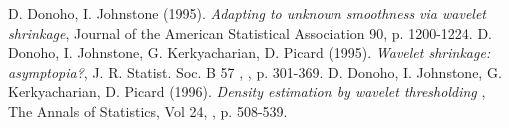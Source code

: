 %
\begin{thebibliography}{20}
 D. Donoho, I. Johnstone (1995). \textit{Adapting to unknown smoothness via wavelet shrinkage}, Journal of the American Statistical Association 90, p. 1200-1224.
 D. Donoho, I. Johnstone, G. Kerkyacharian, D. Picard (1995). \textit{Wavelet shrinkage: asymptopia?}, J. R. Statist. Soc. B 57 ,  , p. 301-369.
 D. Donoho, I. Johnstone, G. Kerkyacharian, D. Picard (1996). \textit{Density estimation by wavelet thresholding }, The Annals of Statistics, Vol 24,  , p. 508-539.


\end{thebibliography}
